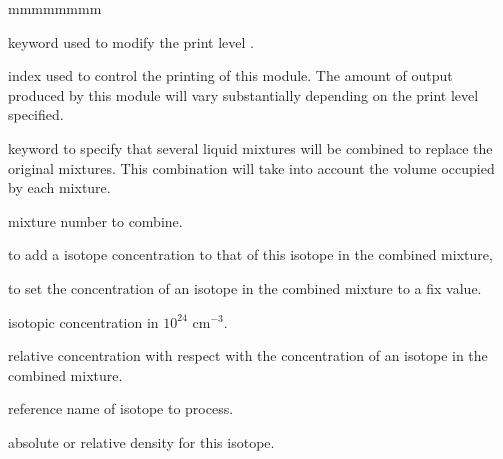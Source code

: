 \begin{ListeDeDescription}{mmmmmmmm}

\item[\moc{EDIT}] keyword used to modify the print level .

\item[\dusa{iprint}] index used to control the printing of this module. The
amount of output produced by this module will vary substantially
depending on the print level specified. 

\item[\moc{MIXCLM}] keyword to specify that several liquid mixtures will be combined to replace the original mixtures. This combination will take into account the volume occupied by each mixture.

\item[\moc{idclm}] mixture number to combine.

\item[\moc{ADDI}] to add a isotope concentration to that of this  isotope in the combined mixture, 
\item[\moc{SETI}] to set the concentration of an isotope in the combined mixture to a fix value.

\item[\moc{ABS}] isotopic concentration in $10^{24}$ cm$^{-3}$.

\item[\moc{REL}] relative concentration with respect with the concentration of an isotope in the combined mixture.

\item[\moc{isot}] reference name of isotope to process.

\item[\moc{dens}] absolute or relative density for this isotope.


\end{ListeDeDescription}
\eject
